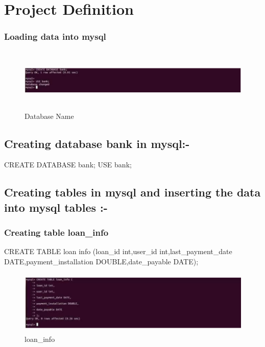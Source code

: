 \chapter{Project Definition}
\subsection{Loading data into mysql}
\begin{figure}[H]
\centering
\includegraphics[width=12cm,height=3cm]{1.png}
    \caption{Database Name}
\end{figure}
 
 \section{Creating database bank in mysql:-}
 CREATE DATABASE bank; \newline
 USE bank;

 \newpage
 \section{Creating tables in mysql and inserting the data into mysql tables :-}
 \subsection{Creating table loan\_info}
 CREATE TABLE loan info (loan\_id int,user\_id int,last\_payment\_date DATE,payment\_installation DOUBLE,date\_payable DATE);
 
\begin{figure}[H]
\centering
\includegraphics[width=12cm,height=3cm]{table2.png}
    \caption{loan\_info}
\end{figure}

